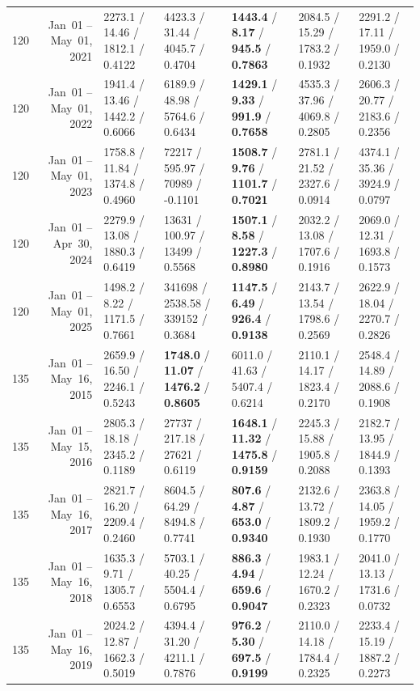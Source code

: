 \begin{longtable}{r r l l l l l}
120 & Jan~01 -- May~01, 2021 & 2273.1 / 14.46 / 1812.1 / 0.4122 & 4423.3 / 31.44 / 4045.7 / 0.4704 & \textbf{1443.4} / \textbf{8.17} / \textbf{945.5} / \textbf{0.7863} & 2084.5 / 15.29 / 1783.2 / 0.1932 & 2291.2 / 17.11 / 1959.0 / 0.2130 \\
120 & Jan~01 -- May~01, 2022 & 1941.4 / 13.46 / 1442.2 / 0.6066 & 6189.9 / 48.98 / 5764.6 / 0.6434 & \textbf{1429.1} / \textbf{9.33} / \textbf{991.9} / \textbf{0.7658} & 4535.3 / 37.96 / 4069.8 / 0.2805 & 2606.3 / 20.77 / 2183.6 / 0.2356 \\
120 & Jan~01 -- May~01, 2023 & 1758.8 / 11.84 / 1374.8 / 0.4960 & 72217 / 595.97 / 70989 / -0.1101 & \textbf{1508.7} / \textbf{9.76} / \textbf{1101.7} / \textbf{0.7021} & 2781.1 / 21.52 / 2327.6 / 0.0914 & 4374.1 / 35.36 / 3924.9 / 0.0797 \\
120 & Jan~01 -- Apr~30, 2024 & 2279.9 / 13.08 / 1880.3 / 0.6419 & 13631 / 100.97 / 13499 / 0.5568 & \textbf{1507.1} / \textbf{8.58} / \textbf{1227.3} / \textbf{0.8980} & 2032.2 / 13.08 / 1707.6 / 0.1916 & 2069.0 / 12.31 / 1693.8 / 0.1573 \\
120 & Jan~01 -- May~01, 2025 & 1498.2 / 8.22 / 1171.5 / 0.7661 & 341698 / 2538.58 / 339152 / 0.3684 & \textbf{1147.5} / \textbf{6.49} / \textbf{926.4} / \textbf{0.9138} & 2143.7 / 13.54 / 1798.6 / 0.2569 & 2622.9 / 18.04 / 2270.7 / 0.2826 \\
\midrule
135 & Jan~01 -- May~16, 2015 & 2659.9 / 16.50 / 2246.1 / 0.5243 & \textbf{1748.0} / \textbf{11.07} / \textbf{1476.2} / \textbf{0.8605} & 6011.0 / 41.63 / 5407.4 / 0.6214 & 2110.1 / 14.17 / 1823.4 / 0.2170 & 2548.4 / 14.89 / 2088.6 / 0.1908 \\
135 & Jan~01 -- May~15, 2016 & 2805.3 / 18.18 / 2345.2 / 0.1189 & 27737 / 217.18 / 27621 / 0.6119 & \textbf{1648.1} / \textbf{11.32} / \textbf{1475.8} / \textbf{0.9159} & 2245.3 / 15.88 / 1905.8 / 0.2088 & 2182.7 / 13.95 / 1844.9 / 0.1393 \\
135 & Jan~01 -- May~16, 2017 & 2821.7 / 16.20 / 2209.4 / 0.2460 & 8604.5 / 64.29 / 8494.8 / 0.7741 & \textbf{807.6} / \textbf{4.87} / \textbf{653.0} / \textbf{0.9340} & 2132.6 / 13.72 / 1809.2 / 0.1930 & 2363.8 / 14.05 / 1959.2 / 0.1770 \\
135 & Jan~01 -- May~16, 2018 & 1635.3 / 9.71 / 1305.7 / 0.6553 & 5703.1 / 40.25 / 5504.4 / 0.6795 & \textbf{886.3} / \textbf{4.94} / \textbf{659.6} / \textbf{0.9047} & 1983.1 / 12.24 / 1670.2 / 0.2323 & 2041.0 / 13.13 / 1731.6 / 0.0732 \\
135 & Jan~01 -- May~16, 2019 & 2024.2 / 12.87 / 1662.3 / 0.5019 & 4394.4 / 31.20 / 4211.1 / 0.7876 & \textbf{976.2} / \textbf{5.30} / \textbf{697.5} / \textbf{0.9199} & 2110.0 / 14.18 / 1784.4 / 0.2325 & 2233.4 / 15.19 / 1887.2 / 0.2273 \\

\end{longtable}
